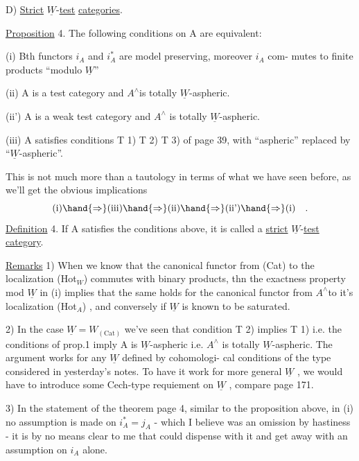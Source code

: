 
D) \uline{Strict} \uline{$\underline{W}$}-\uline{test} \uline{categories}.

\uline{Proposition} 4. The following conditions on A are equivalent:

(i) Bth functors $i_A$ and $i^*_A$ are model preserving, moreover $i_A$ com-%
mutes to finite products ``modulo $\underline{W}$'' \hand{,} 

(ii) A is a test category and $A^\wedge$\hand{/}is totally $\underline{W}$-aspheric.

(ii') A is a weak test category and $A^\wedge$ is totally $\underline{W}$-aspheric.

(iii) A satisfies conditions T 1) T 2) T 3) of page 39, with
``aspheric'' replaced by ``$\underline{W}$-aspheric''.

This is not much more than a tautology in terms of what we have
seen before, as we'll get the obvious implications
\[ \text{(i)} \hand{\Rightarrow} \text{(iii)} \hand{\Rightarrow} \text{(ii)} \hand{\Rightarrow} \text{(ii')} \hand{\Rightarrow} \text{(i)} \quad . \]
\uline{Definition} 4. If A satisfies the conditions above, it is called a
\uline{strict} \uline{$\underline{W}$}-\uline{test} \uline{category}.

\uline{Remarks} 1) When we know that the canonical functor from (Cat) to
the localization (Hot$_{W}$) commutes with binary products, 
 thn the exactness property mod $\underline{W}$ in (i) implies that
the same holds for the canonical functor from $A^\wedge$\hand{/}to it's localization
(Hot$_A$) , and conversely if $\underline{W}$ is known to be saturated.

2) In the case $\underline{W} = W_{(\mathrm{Cat})}$ we've seen that condition T 2) implies
T 1) i.e. the conditions of prop.1 imply A is $\underline{W}$-aspheric i.e. $A^\wedge$ is
totally $\underline{W}$-aspheric. The argument works for any $\underline{W}$ defined by cohomologi-%
cal conditions of the type considered in yesterday's notes. To have it
work for more general $\underline{W}$ , we would have to introduce some \hand{\v{}}Cech-type
requiement on $\underline{W}$ , compare page 171.

3)  In the statement of the theorem page 4, similar to
the proposition above, in (i) no assumption is made on $i^*_A = j_A$ - which
I believe was an omission by hastiness - it is by no means clear to me
that  could dispense with it\hand{,} and get away with an assumption on $i_A$ 
alone.

